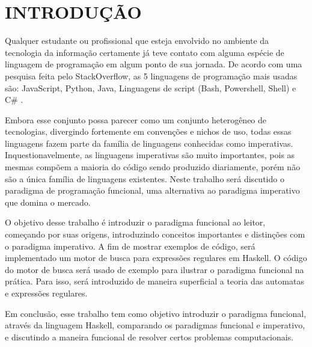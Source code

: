 \section{INTRODUÇÃO}
Qualquer estudante ou profissional que esteja envolvido no ambiente da tecnologia da informação certamente já teve contato com alguma espécie de linguagem de programação em algum ponto de sua jornada.
De acordo com uma pesquisa feita pelo StackOverflow, as 5 linguagens de programação mais usadas são: JavaScript, Python, Java, Linguagens de script (Bash, Powershell, Shell) e C\# \cite{stack-overflow}.

Embora esse conjunto possa parecer como um conjunto heterogêneo de tecnologias, divergindo fortemente em convenções e nichos de uso, todas essas linguagens fazem parte da família de linguagens conhecidas como imperativas.
Inquestionavelmente, as linguagens imperativas são muito importantes, pois as mesmas compõem a maioria do código sendo produzido diariamente, porém não são a única família de linguagens existentes.
Neste trabalho será discutido o paradigma de programação funcional, uma alternativa ao paradigma imperativo que domina o mercado.

O objetivo desse trabalho é introduzir o paradigma funcional ao leitor, começando por suas origens, introduzindo conceitos importantes e distinções com o paradigma imperativo.
A fim de mostrar exemplos de código, será implementado um motor de busca para expressões regulares em Haskell.
O código do motor de busca será usado de exemplo para ilustrar o paradigma funcional na prática.
Para isso, será introduzido de maneira superficial a teoria das automatas e expressões regulares.

Em conclusão, esse trabalho tem como objetivo introduzir o paradigma funcional, através da linguagem Haskell, comparando os paradigmas funcional e imperativo, e discutindo a maneira funcional de resolver certos problemas computacionais.
